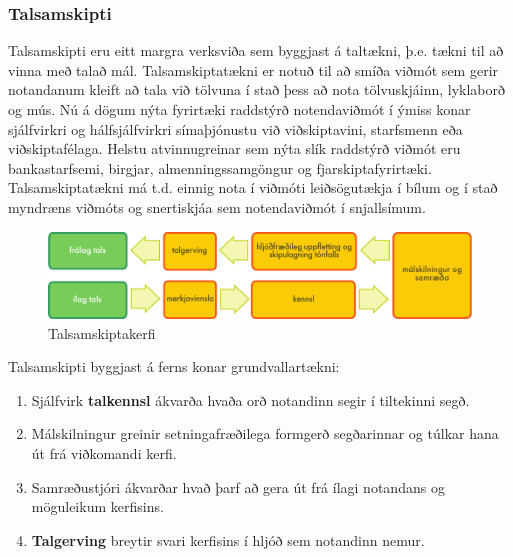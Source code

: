 \documentclass{../../metanetpaper}
\begin{document}
\begin{multicols}{2}
\subsubsection{Talsamskipti}

Talsamskipti eru eitt margra verksviða sem byggjast á taltækni, þ.e. tækni til að vinna með talað mál. Talsamskiptatækni er notuð til að smíða viðmót sem gerir notandanum kleift að tala við tölvuna í stað þess að nota tölvuskjáinn, lyklaborð og mús. Nú á dögum nýta fyrirtæki raddstýrð notendaviðmót í ýmiss konar sjálfvirkri og hálfsjálfvirkri símaþjónustu við viðskiptavini, starfsmenn eða viðskiptafélaga. Helstu atvinnugreinar sem nýta slík raddstýrð viðmót eru bankastarfsemi, birgjar, almenningssamgöngur og fjarskiptafyrirtæki. Talsamskiptatækni má t.d. einnig nota í viðmóti leiðsögutækja í bílum og í stað myndræns viðmóts og snertiskjáa sem notendaviðmót í snjallsímum. 

\begin{figure}[htb]
  \center 
  \includegraphics[width=\textwidth]{../_media/icelandic/simple_speech-based_dialogue_architecture}
  \caption{Talsamskiptakerfi}
  \label{fig:dialoguearch_is}
\end{figure}

Talsamskipti byggjast á ferns konar grundvallartækni:

\begin{enumerate}
\item Sjálfvirk \textbf{talkennsl} ákvarða hvaða orð notandinn segir í tiltekinni segð. 
\item Málskilningur greinir setningafræðilega formgerð segðarinnar og túlkar hana út frá viðkomandi kerfi.
\item Samræðustjóri ákvarðar hvað þarf að gera út frá ílagi notandans og möguleikum kerfisins.
\item \textbf{Talgerving} breytir svari kerfisins í hljóð sem notandinn nemur. 
\end{enumerate}


\end{multicols}
\end{document}
